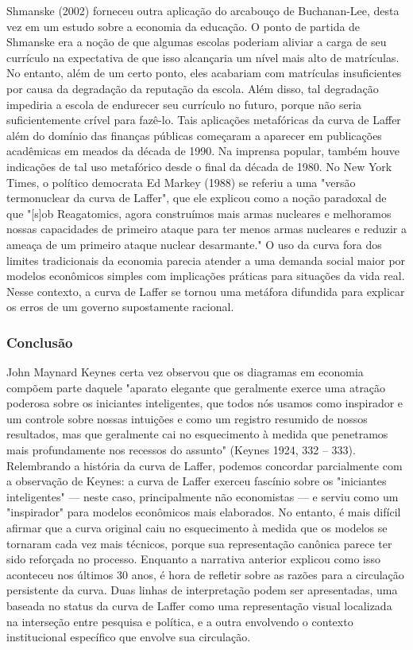 \documentclass[12pt]{article}
\begin{document}
Shmanske (2002) forneceu outra aplicação do arcabouço de Buchanan-Lee, desta vez em um estudo sobre a economia da educação. O ponto de partida de Shmanske era a noção de que algumas escolas poderiam aliviar a carga de seu currículo na expectativa de que isso alcançaria um nível mais alto de matrículas. No entanto, além de um certo ponto, eles acabariam com matrículas insuficientes por causa da degradação da reputação da escola. Além disso, tal degradação impediria a escola de endurecer seu currículo no futuro, porque não seria suficientemente crível para fazê-lo. Tais aplicações metafóricas da curva de Laffer além do domínio das finanças públicas começaram a aparecer em publicações acadêmicas em meados da década de 1990. Na imprensa popular, também houve indicações de tal uso metafórico desde o final da década de 1980. No New York Times, o político democrata Ed Markey (1988) se referiu a uma "versão termonuclear da curva de Laffer", que ele explicou como a noção paradoxal de que "[s]ob Reagatomics, agora construímos mais armas nucleares e melhoramos nossas capacidades de primeiro ataque para ter menos armas nucleares e reduzir a ameaça de um primeiro ataque nuclear desarmante." O uso da curva fora dos limites tradicionais da economia parecia atender a uma demanda social maior por modelos econômicos simples com implicações práticas para situações da vida real. Nesse contexto, a curva de Laffer se tornou uma metáfora difundida para explicar os erros de um governo supostamente racional.

\subsubsection{\textbf{Conclusão}}
John Maynard Keynes certa vez observou que os diagramas em economia compõem parte daquele "aparato elegante que geralmente exerce uma atração poderosa sobre os iniciantes inteligentes, que todos nós usamos como inspirador e um controle sobre nossas intuições e como um registro resumido de nossos resultados, mas que geralmente cai no esquecimento à medida que penetramos mais profundamente nos recessos do assunto" (Keynes 1924, 332 – 333). Relembrando a história da curva de Laffer, podemos concordar parcialmente com a observação de Keynes: a curva de Laffer exerceu fascínio sobre os "iniciantes inteligentes" — neste caso, principalmente não economistas — e serviu como um "inspirador" para modelos econômicos mais elaborados. No entanto, é mais difícil afirmar que a curva original caiu no esquecimento à medida que os modelos se tornaram cada vez mais técnicos, porque sua representação canônica parece ter sido reforçada no processo. Enquanto a narrativa anterior explicou como isso aconteceu nos últimos 30 anos, é hora de refletir sobre as razões para a circulação persistente da curva. Duas linhas de interpretação podem ser apresentadas, uma baseada no status da curva de Laffer como uma representação visual localizada na interseção entre pesquisa e política, e a outra envolvendo o contexto institucional específico que envolve sua circulação.
\end{document}
